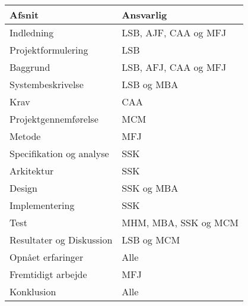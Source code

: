 \begin{longtabu} to 
    Afsnit &    Ansvarlig\\[-1ex]
    \midrule
    Indledning & LSB, AJF, CAA og MFJ \\
    Projektformulering & LSB \\Baggrund & LSB, AFJ, CAA og MFJ \\
    Systembeskrivelse & LSB og MBA \\
    Krav & CAA \\
    Projektgennemførelse & MCM \\
    Metode & MFJ \\
    Specifikation og analyse & SSK \\
    Arkitektur & SSK \\
    Design & SSK og MBA \\
    Implementering & SSK \\
    Test & MHM, MBA, SSK og MCM \\
    Resultater og Diskussion & LSB og MCM \\
    Opnået erfaringer & Alle \\
    Fremtidigt arbejde & MFJ \\
    Konklusion & Alle \\    
    
    

\end{longtabu}